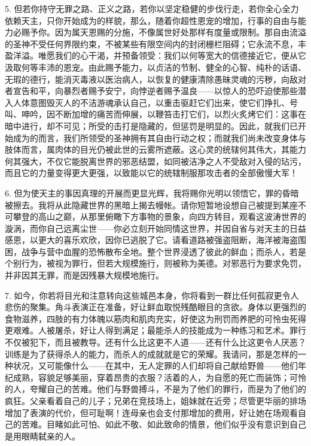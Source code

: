 5. 但若你持守无罪之路、正义之路，若你以坚定稳健的步伐行走，若你全心全力依赖天主，只你开始成为的样貌，那么，随着你超性恩宠的增加，行事的自由与能力必赐予你。因为属天恩赐的分施，不像属世好处那样有度量或限制。那自由流溢的圣神不受任何界限约束，不被某些有限空间内的封闭栅栏阻碍；它永流不息，丰盈洋溢。唯愿我们的心干渴，并预备领受：我们以何等宽大的信德接近它，便从它汲取何等丰沛的恩宠。由此赐予能力，以贞洁的节制、健全的心智、纯朴的话语、无瑕的德行，能消灭毒液以医治病人，以恢复的健康清除愚昧灵魂的污秽，向敌对者宣告和平，向暴烈者赐予安宁，向悖逆者赐予温良——以惊人的恐吓迫使那些潜入人体意图毁灭人的不洁游魂承认自己，以重击驱赶它们出来，使它们挣扎、号叫、呻吟，因不断加增的痛苦而伸展，以鞭笞击打它们，以烈火炙烤它们：这事在暗中进行，却不可见；所受的击打是隐藏的，但惩罚是明显的。因此，就我们已开始成为的而言，我们所领受的圣神拥有其自由行动之权；而就我们尚未改变身体与肢体而言，属肉体的目光仍被此世的云雾所遮蔽。这心灵的统辖何其伟大，其能力何其强大，不仅它能脱离世界的邪恶结盟，如同被洁净之人不受敌对入侵的玷污，而且它的力量变得更大更强，以致能以它的统辖制服那攻击者的全部傲慢大军！\par

6. 但为使天主的事因真理的开展而更显光辉，我将赐你光明以领悟它，罪的昏暗被擦去。我将从此隐藏世界的黑暗上揭去幔帐。请你短暂地设想自己被提到某座不可攀登的高山之巅，从那里俯瞰下方事物的景象，向四方转目，观看这波涛世界的漩涡，而你自己远离尘世——你必立刻开始同情这世界，并因自省与对天主的日益感恩，以更大的喜乐欢欣，因你已逃脱了它。请看道路被强盗阻断，海洋被海盗围困，战争与营中血腥的恐怖散布全地。整个世界浸透了彼此的鲜血；而杀人，若是个别行为，被视为罪行，但若大规模施行，则被称为美德。对邪恶行为要求免罚，并非因其无罪，而是因残暴大规模地施行。\par

7. 如今，你若将目光和注意转向这些城邑本身，你将看到一群比任何孤寂更令人悲伤的聚集。角斗表演正在准备，好让鲜血取悦残酷眼目的贪欲。身体以更强烈的食物滋养，四肢的有力体魄以筋肉和肌肉充实，好使这为刑罚而养肥的可怜虫死得更艰难。人被屠杀，好让人得到满足；最能杀人的技能成为一种练习和艺术。罪行不仅被犯下，而且被教导。还有什么比这更不人道——还有什么比这更令人厌恶？训练是为了获得杀人的能力，而杀人的成就就是它的荣耀。我请问，那是怎样的一种状况，又可能像什么——在其中，无人定罪的人们却将自己献给野兽——他们年纪成熟，容貌足够美丽，穿着昂贵的衣服？活着的人，为自愿的死亡而装饰；可怜的人，夸耀自己的苦难。他们与野兽搏斗，不是为了他们的罪行，而是为了他们的疯狂。父亲看着自己的儿子；兄弟在竞技场上，姐妹就在近旁；尽管更华丽的排场增加了表演的代价，但可耻啊！连母亲也会支付那增加的费用，好让她在场观看自己的苦难。目睹如此可怕、如此不敬、如此致命的情景，他们似乎没有意识到自己是用眼睛弑亲的人。\par

